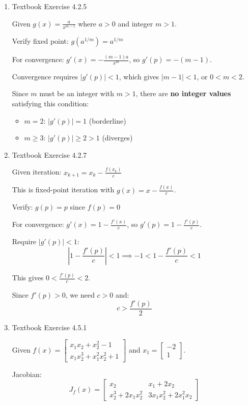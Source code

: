 \documentclass[reqno, answers]{exam}
\begin{document}
\begin{enumerate}
\item Textbook Exercise 4.2.5
\begin{solution}
Given $g(x) = \frac{a}{x^{m-1}}$ where $a > 0$ and integer $m > 1$.

Verify fixed point: $g(a^{1/m}) = a^{1/m}$ \checkmark

For convergence: $g'(x) = -\frac{(m-1)a}{x^m}$, so $g'(p) = -(m-1)$.

Convergence requires $|g'(p)| < 1$, which gives $|m-1| < 1$, or $0 < m < 2$.

Since $m$ must be an integer with $m > 1$, there are \textbf{no integer values} satisfying this condition:
\begin{itemize}
\item $m = 2$: $|g'(p)| = 1$ (borderline)
\item $m \geq 3$: $|g'(p)| \geq 2 > 1$ (diverges)
\end{itemize}
\end{solution}

\item Textbook Exercise 4.2.7
\begin{solution}
Given iteration: $x_{k+1} = x_k - \frac{f(x_k)}{c}$

This is fixed-point iteration with $g(x) = x - \frac{f(x)}{c}$.

Verify: $g(p) = p$ since $f(p) = 0$ \checkmark

For convergence: $g'(x) = 1 - \frac{f'(x)}{c}$, so $g'(p) = 1 - \frac{f'(p)}{c}$.

Require $|g'(p)| < 1$:
$$\left|1 - \frac{f'(p)}{c}\right| < 1 \implies -1 < 1 - \frac{f'(p)}{c} < 1$$

This gives $0 < \frac{f'(p)}{c} < 2$.

Since $f'(p) > 0$, we need $c > 0$ and:
$$\boxed{c > \frac{f'(p)}{2}}$$
\end{solution}

\item Textbook Exercise 4.5.1
\begin{solution}
Given $f(x) = \begin{bmatrix} x_1 x_2 + x_2^2 - 1 \\ x_1 x_2^3 + x_1^2 x_2^2 + 1 \end{bmatrix}$ and $x_1 = \begin{bmatrix} -2 \\ 1 \end{bmatrix}$.

Jacobian:
$$J_f(x) = \begin{bmatrix} x_2 & x_1 + 2x_2 \\ x_2^3 + 2x_1 x_2^2 & 3x_1 x_2^2 + 2x_1^2 x_2 \end{bmatrix}$$


\end{solution}
\end{enumerate}
\end{document}
